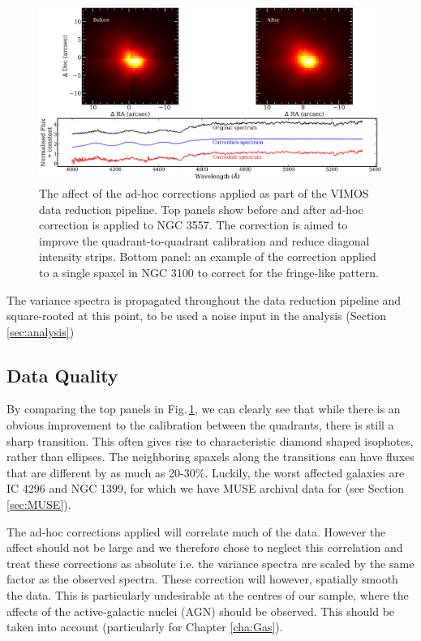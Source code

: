 		\begin{figure}
			\centering
			\includegraphics[width=.9\textwidth]{chapter2/corr_image.png}
			\caption[Ad-hoc correction to VIMOS datacubes]{The affect of the ad-hoc corrections applied as part of the VIMOS data reduction pipeline. Top panels show before and after ad-hoc correction is applied to NGC 3557. The correction is aimed to improve the quadrant-to-quadrant calibration and reduce diagonal intensity strips. Bottom panel: an example of the correction applied to a single spaxel in NGC 3100 to correct for the fringe-like pattern.}
			\label{fig:Correction}
		\end{figure}

		The variance spectra is propagated throughout the data reduction pipeline and square-rooted at this point, to be used a noise input in the analysis (Section \ref{sec:analysis})

	\subsection{Data Quality}
		\label{subsec:VIMOSartifacts}
		By comparing the top panels in Fig.\,\ref{fig:Correction}, we can clearly see that while there is an obvious improvement to the calibration between the quadrants, there is still a sharp transition. This often gives rise to characteristic diamond shaped isophotes, rather than ellipses. The neighboring spaxels along the transitions can have fluxes that are different by as much as 20-30\%. Luckily, the worst affected galaxies are IC 4296 and NGC 1399, for which we have MUSE archival data for (see Section \ref{sec:MUSE}). 

		The ad-hoc corrections applied will correlate much of the data. However the affect should not be large and we therefore chose to neglect this correlation and treat these corrections as absolute i.e. the variance spectra are scaled by the same factor as the observed spectra. These correction will however, spatially smooth the data. This is particularly undesirable at the centres of our sample, where the affects of the active-galactic nuclei (AGN) should be observed. This should be taken into account (particularly for Chapter \ref{cha:Gas}).


